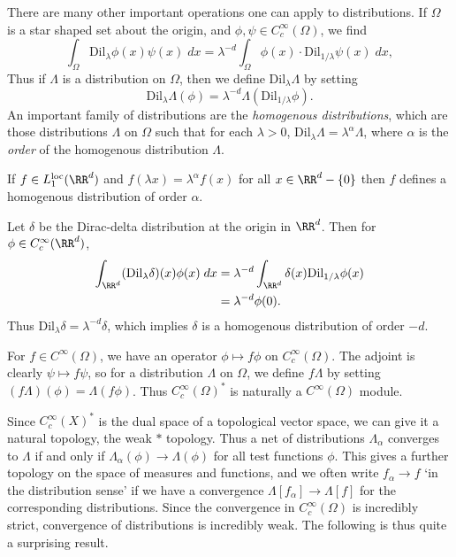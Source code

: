 There are many other important operations one can apply to distributions. If $\Omega$ is a star shaped set about the origin, and $\phi,\psi \in C_c^\infty(\Omega)$, we find
%
\[ \int_{\Omega} \text{Dil}_\lambda \phi(x) \psi(x)\; dx = \lambda^{-d} \int_{\Omega} \phi(x) \cdot \text{Dil}_{1/\lambda} \psi(x)\; dx, \]
%
Thus if $\Lambda$ is a distribution on $\Omega$, then we define $\text{Dil}_\lambda \Lambda$ by setting
%
\[ \text{Dil}_\lambda \Lambda (\phi) = \lambda^{-d} \Lambda( \text{Dil}_{1/\lambda} \phi). \]
%
An important family of distributions are the \emph{homogenous distributions}, which are those distributions $\Lambda$ on $\Omega$ such that for each $\lambda > 0$, $\text{Dil}_\lambda \Lambda = \lambda^\alpha \Lambda$, where $\alpha$ is the \emph{order} of the homogenous distribution $\Lambda$.

\begin{example}
  If $f \in L_1^{\text{loc}}(\RR^d)$ and $f(\lambda x) = \lambda^\alpha f(x)$ for all $x \in \RR^d - \{ 0 \}$ then $f$ defines a homogenous distribution of order $\alpha$.
\end{example}

\begin{example}
  Let $\delta$ be the Dirac-delta distribution at the origin in $\RR^d$. Then for $\phi \in C_c^\infty(\RR^d)$,
  \begin{align*}
    \int_{\RR^d} (\text{Dil}_\lambda \delta)(x) \phi(x)\; dx &= \lambda^{-d} \int_{\RR^d} \delta(x) \text{Dil}_{1/\lambda} \phi(x)\\
    &= \lambda^{-d} \phi(0).
  \end{align*}
  Thus $\text{Dil}_\lambda \delta = \lambda^{-d} \delta$, which implies $\delta$ is a homogenous distribution of order $-d$.
\end{example}

For $f \in C^\infty(\Omega)$, we have an operator $\phi \mapsto f \phi$ on $C_c^\infty(\Omega)$. The adjoint is clearly $\psi \mapsto f \psi$, so for a distribution $\Lambda$ on $\Omega$, we define $f \Lambda$ by setting $(f\Lambda)(\phi) = \Lambda(f \phi)$. Thus $C_c^\infty(\Omega)^*$ is naturally a $C^\infty(\Omega)$ module.

Since $C_c^\infty(X)^*$ is the dual space of a topological vector space, we can give it a natural topology, the weak $*$ topology. Thus a net of distributions $\Lambda_\alpha$ converges to $\Lambda$ if and only if $\Lambda_\alpha(\phi) \to \Lambda(\phi)$ for all test functions $\phi$. This gives a further topology on the space of measures and functions, and we often write $f_\alpha \to f$ `in the distribution sense' if we have a convergence $\Lambda[f_\alpha] \to \Lambda[f]$ for the corresponding distributions. Since the convergence in $C_c^\infty(\Omega)$ is incredibly strict, convergence of distributions is incredibly weak. The following is thus quite a surprising result.

